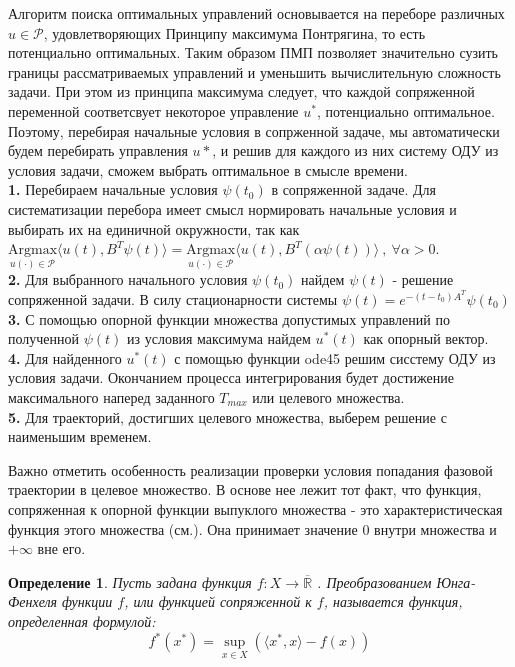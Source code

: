 \documentclass[10pt]{article}
\newtheorem{definition}{Определение}
\begin{document}
Алгоритм поиска оптимальных управлений основывается на переборе различных \( u \in \mathcal{P} \), удовлетворяющих Принципу максимума Понтрягина, то есть потенциально оптимальных. Таким образом ПМП позволяет значительно сузить границы рассматриваемых управлений и уменьшить вычислительную сложность задачи. При этом из принципа максимума следует, что каждой сопряженной переменной соответсвует некоторое управление \( u^* \), потенциально оптимальное. Поэтому, перебирая начальные условия в сопрженной задаче, мы автоматически будем перебирать управления \( u* \), и решив для каждого из них систему ОДУ из условия задачи, сможем выбрать оптимальное в смысле времени.\bigskip\\
\textbf{1.} Перебираем начальные условия \( \psi(t_0) \) в сопряженной задаче. Для систематизации перебора имеет смысл нормировать начальные условия и выбирать их на единичной окружности, так как \( \underset{u(\cdot) \in \mathcal{P}}{\text{Argmax}} \langle u(t), B^T \psi(t) \rangle = \underset{u(\cdot) \in \mathcal{P}}{\text{Argmax}} \langle u(t), B^T (\alpha \psi(t)) \rangle \ , \ \forall \alpha > 0. \)\medskip\\
\textbf{2.} Для выбранного начального условия \( \psi(t_0) \) найдем \( \psi(t) \) - решение сопряженной задачи. В силу стационарности системы \( \psi(t) = e^{-(t - t_0)A^{T}}\psi(t_0) \)\medskip\\
\textbf{3.} С помощью опорной функции множества допустимых управлений по полученной \( \psi(t) \) из условия максимума найдем \( u^*(t) \) как опорный вектор.\medskip\\
\textbf{4.} Для найденного \( u^*(t) \) с помощью функции ode45 решим сисстему ОДУ из условия задачи. Окончанием процесса интегрирования будет достижение максимального наперед заданного \( T_{max} \) или целевого множества.\medskip\\
\textbf{5.} Для траекторий, достигших целевого множества, выберем решение с наименьшим временем.

Важно отметить особенность реализации проверки условия попадания фазовой траектории в целевое множество. В основе нее лежит тот факт, что функция, сопряженная к опорной функции выпуклого множества - это характеристическая функция этого множества (см.\cite{2}). Она принимает значение 0 внутри множества и \( + \infty \) вне его. 

\begin{definition}
	Пусть задана функция \( f: X \to \overline{\mathbb{R}} \) . Преобразованием Юнга-Фенхеля функции \( f \), или функцией сопряженной к \( f \), называется функция, определенная формулой: 
	\[ f^{*}(x^{*})=\sup _{x\in X} ( \langle x^{*} , x \rangle -f(x) ) \]
\end{definition}
\end{document}
